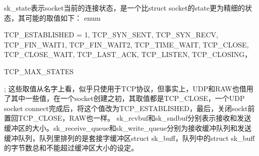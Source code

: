     sk_state表示socket当前的连接状态，是一个比struct socket的state更为精细的状态，其可能的取值如下：    enum {
        TCP_ESTABLISHED = 1,
        TCP_SYN_SENT,
        TCP_SYN_RECV,
        TCP_FIN_WAIT1,
        TCP_FIN_WAIT2,
        TCP_TIME_WAIT,
        TCP_CLOSE,
        TCP_CLOSE_WAIT,
        TCP_LAST_ACK,
        TCP_LISTEN,
        TCP_CLOSING，

        TCP_MAX_STATES
    };
    这些取值从名字上看，似乎只使用于TCP协议，但事实上，UDP和RAW也借用了其中一些值，在一个socket创建之初，其取值都是TCP_CLOSE，一个UDP socket connect完成后，将这个值改为TCP_ESTABLISHED，最后，关闭sockt前置回TCP_CLOSE，RAW也一样。
    sk_rcvbuf和sk_sndbuf分别表示接收和发送缓冲区的大小。sk_receive_queue和sk_write_queue分别为接收缓冲队列和发送缓冲队列，队列里排列的是套接字缓冲区struct sk_buff，队列中的struct sk_buff的字节数总和不能超过缓冲区大小的设定。
